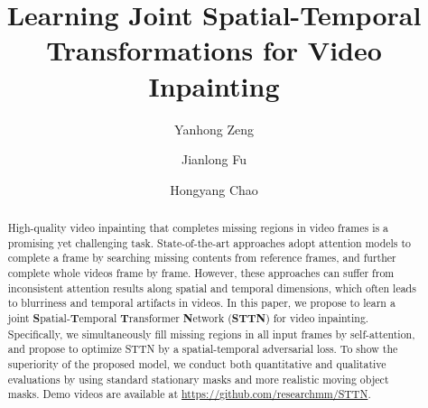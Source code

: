 \documentclass[runningheads]{llncs}
\begin{document}
\pagestyle{headings}
\mainmatter
\def\ECCVSubNumber{2590}  


\title{Learning Joint Spatial-Temporal Transformations for Video Inpainting}
\begin{comment}
\titlerunning{ECCV-20 submission ID \ECCVSubNumber} 
\authorrunning{ECCV-20 submission ID \ECCVSubNumber} 
\author{Anonymous ECCV submission}
\institute{Paper ID \ECCVSubNumber}
\end{comment}


\author{Yanhong Zeng \and
Jianlong Fu \and
Hongyang Chao}
\maketitle 

\begin{abstract}

High-quality video inpainting that completes missing regions in video frames is a promising yet challenging task. State-of-the-art approaches adopt attention models to complete a frame by searching missing contents from reference frames, and further complete whole videos frame by frame. 
However, these approaches can suffer from inconsistent attention results along spatial and temporal dimensions, which often leads to blurriness and temporal artifacts in videos. 
In this paper, we propose to learn a joint \textbf{S}patial-\textbf{T}emporal \textbf{T}ransformer \textbf{N}etwork (\textbf{STTN}) for video inpainting. 
Specifically, we simultaneously fill missing regions in all input frames by self-attention, and propose to optimize STTN by a spatial-temporal adversarial loss. 
To show the superiority of the proposed model, we conduct both quantitative and qualitative evaluations by using standard stationary masks and more realistic moving object masks. Demo videos are available at \url{https://github.com/researchmm/STTN}.

\end{abstract}
\end{document}
